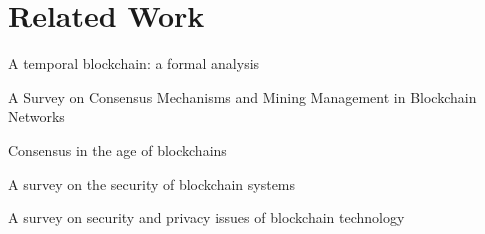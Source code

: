 \section{Related Work}
\label{sub:related}
A temporal blockchain: a formal analysis \cite{dennis2016temporal}

A Survey on Consensus Mechanisms and Mining Management in Blockchain Networks \cite{wang2018survey}

Consensus in the age of blockchains \cite{bano2017consensus}

A survey on the security of blockchain systems \cite{li2017survey}


A survey on security and privacy issues of blockchain technology \cite{joshi2018survey}



